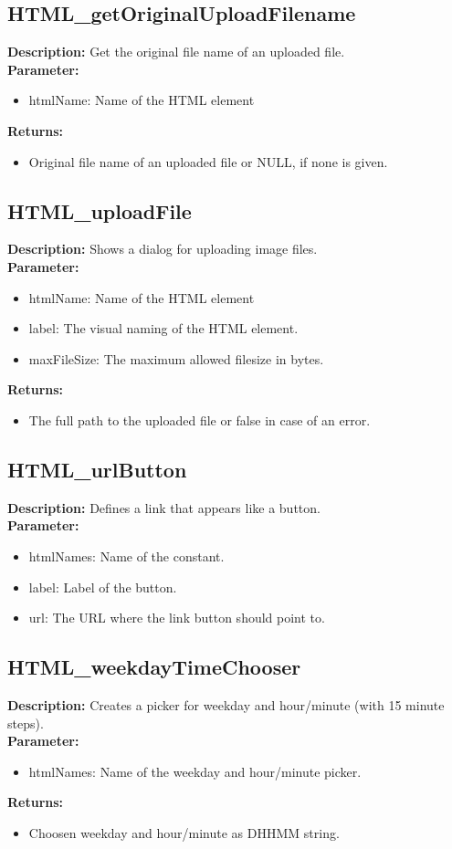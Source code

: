 \subsection{HTML\_getOriginalUploadFilename}
\textbf{Description:} Get the original file name of an uploaded file.\\
\textbf{Parameter:}
\begin{itemize}
\item htmlName: Name of the HTML element
\end{itemize}
\textbf{Returns:}
\begin{itemize}
\item Original file name of an uploaded file or NULL, if none is given.
\end{itemize}

\subsection{HTML\_uploadFile}
\textbf{Description:} Shows a dialog for uploading image files.\\
\textbf{Parameter:}
\begin{itemize}
\item htmlName: Name of the HTML element
\item label: The visual naming of the HTML element.
\item maxFileSize: The maximum allowed filesize in bytes.
\end{itemize}
\textbf{Returns:}
\begin{itemize}
\item The full path to the uploaded file or false in case of an error.
\end{itemize}

\subsection{HTML\_urlButton}
\textbf{Description:} Defines a link that appears like a button.\\
\textbf{Parameter:}
\begin{itemize}
\item htmlNames: Name of the constant.
\item label: Label of the button.
\item url: The URL where the link button should point to.
\end{itemize}

\subsection{HTML\_weekdayTimeChooser}
\textbf{Description:} Creates a picker for weekday and hour/minute (with 15 minute steps).\\
\textbf{Parameter:}
\begin{itemize}
\item htmlNames: Name of the weekday and hour/minute picker.
\end{itemize}
\textbf{Returns:}
\begin{itemize}
\item Choosen weekday and hour/minute as DHHMM string.
\end{itemize}

